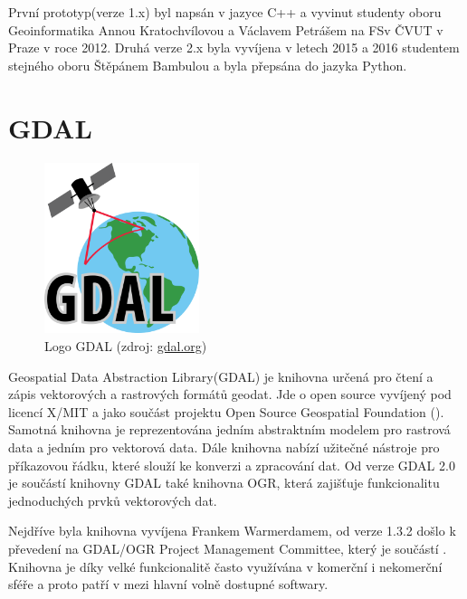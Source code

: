 První prototyp(verze 1.x) byl napsán v jazyce C++ a vyvinut studenty oboru Geoinformatika Annou Kratochvílovou a Václavem Petrášem na FSv ČVUT v Praze v roce 2012. Druhá verze 2.x byla vyvíjena v letech 2015 a 2016 studentem stejného oboru Štěpánem Bambulou a byla přepsána do jazyka Python. \citep{vfk_qgis_plugin}
 
\section{GDAL}

\begin{figure}[H]
	 \centering
      \includegraphics[height=5cm]{./pictures/gdal-logo.png}
      \caption{Logo GDAL (zdroj:
\href{https://upload.wikimedia.org/wikipedia/commons/thumb/d/df/GDALLogoColor.svg/572px-GDALLogoColor.svg.png}{gdal.org})}
      \label{fig:gdal}
  \end{figure}
  
Geospatial Data Abstraction Library(GDAL) je knihovna určená pro čtení a zápis vektorových a rastrových formátů geodat. Jde o open source vyvíjený pod licencí X/MIT a jako součást projektu Open Source Geospatial Foundation (). Samotná knihovna je reprezentována jedním abstraktním modelem pro rastrová data a jedním pro vektorová data. Dále knihovna nabízí užitečné nástroje pro příkazovou řádku, které slouží ke konverzi a zpracování dat. Od verze GDAL 2.0 je součástí knihovny GDAL také knihovna OGR, která zajišťuje funkcionalitu jednoduchých prvků vektorových dat.

Nejdříve byla knihovna vyvíjena Frankem Warmerdamem, od verze 1.3.2 došlo k převedení na GDAL/OGR Project Management Committee, který je součástí . Knihovna je díky velké funkcionalitě často využívána v komerční i nekomerční sféře a proto patří v  mezi hlavní volně dostupné softwary. \cite{gdal, gdal_wiki}

